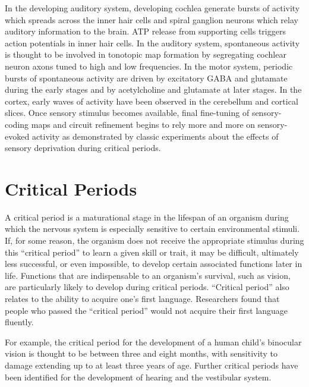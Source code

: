 In the developing auditory system, developing cochlea generate bursts of activity which spreads across the inner hair cells and spiral ganglion neurons which relay auditory information to the brain. ATP release from supporting cells triggers action potentials in inner hair cells. In the auditory system, spontaneous activity is thought to be involved in tonotopic map formation by segregating cochlear neuron axons tuned to high and low frequencies. In the motor system, periodic bursts of spontaneous activity are driven by excitatory GABA and glutamate during the early stages and by acetylcholine and glutamate at later stages. In the cortex, early waves of activity have been observed in the cerebellum and cortical slices. Once sensory stimulus becomes available, final fine-tuning of sensory-coding maps and circuit refinement begins to rely more and more on sensory-evoked activity as demonstrated by classic experiments about the effects of sensory deprivation during critical periods.

\hypertarget{critical-periods}{%
\section{Critical Periods}\label{critical-periods}}

A critical period is a maturational stage in the lifespan of an organism during which the nervous system is especially sensitive to certain environmental stimuli. If, for some reason, the organism does not receive the appropriate stimulus during this ``critical period'' to learn a given skill or trait, it may be difficult, ultimately less successful, or even impossible, to develop certain associated functions later in life. Functions that are indispensable to an organism's survival, such as vision, are particularly likely to develop during critical periods. ``Critical period'' also relates to the ability to acquire one's first language. Researchers found that people who passed the ``critical period'' would not acquire their first language fluently.

For example, the critical period for the development of a human child's binocular vision is thought to be between three and eight months, with sensitivity to damage extending up to at least three years of age. Further critical periods have been identified for the development of hearing and the vestibular system.

